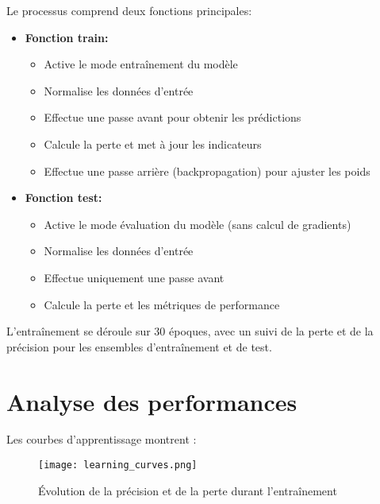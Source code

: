 \documentclass[11pt,a4paper]{article}
\begin{document}
Le processus comprend deux fonctions principales:
\begin{itemize}
    \item \textbf{Fonction train:}
    \begin{itemize}
        \item Active le mode entraînement du modèle
        \item Normalise les données d'entrée
        \item Effectue une passe avant pour obtenir les prédictions
        \item Calcule la perte et met à jour les indicateurs
        \item Effectue une passe arrière (backpropagation) pour ajuster les poids
    \end{itemize}
    
    \item \textbf{Fonction test:}
    \begin{itemize}
        \item Active le mode évaluation du modèle (sans calcul de gradients)
        \item Normalise les données d'entrée
        \item Effectue uniquement une passe avant
        \item Calcule la perte et les métriques de performance
    \end{itemize}
\end{itemize}

L'entraînement se déroule sur 30 époques, avec un suivi de la perte et de la précision pour les ensembles d'entraînement et de test.

\section{Analyse des performances}
\label{subsec:performances}

Les courbes d'apprentissage montrent :

\begin{figure}[H]
    \centering
    \texttt{[image: learning\_curves.png]}
    \caption{Évolution de la précision et de la perte durant l'entraînement}
    \label{fig:curves}
\end{figure}
\end{document}

